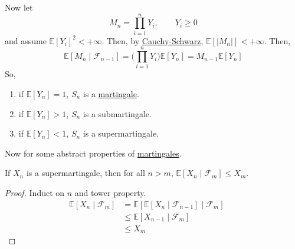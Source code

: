 	\begin{example}
	  \label{ex:products-of-nonnegative-random-variables}
	  Now let 
		\begin{equation}
			M_n = \prod_{i=1}^n Y_i, \qquad Y_i \geq 0
		\end{equation}
		and assume $\mathbb{E}[Y_i]^2 < +\infty$. Then, by \hyperref[thm:cauchy-schwarz]{Cauchy-Schwarz}, $\mathbb{E}[|M_n|] < +\infty$. Then, 
		\begin{equation}
			\mathbb{E}[M_n \mid \mathscr{F}_{n-1}] = \bigg( \prod_{i=1}^n Y_i \bigg) \mathbb{E}[Y_n] = M_{n-1} \mathbb{E}[Y_n]
		\end{equation}
		So, 
		\begin{enumerate}
			\item if $\mathbb{E}[Y_n] = 1$, $S_n$ is a \hyperref[def:martingale]{martingale}. 
			\item if $\mathbb{E}[Y_n] > 1$, $S_n$ is a submartingale. 
			\item if $\mathbb{E}[Y_n] < 1$, $S_n$ is a supermartingale. 
		\end{enumerate}
	\end{example}

	Now for some abstract properties of \hyperref[def:martingale]{martingales}. 

	\begin{lemma}
	  \label{thm:supermartingale-inequality-over-several-steps}
 
		If $X_n$ is a supermartingale, then for all $n > m$, $\mathbb{E}[X_n \mid \mathscr{F}_m] \leq X_m$.
	\end{lemma}
	\begin{proof}
	  Induct on $n$ and tower property. 
		\begin{align}
			\mathbb{E}[X_n \mid \mathscr{F}_m] & = \mathbb{E}[\mathbb{E}[X_n \mid \mathscr{F}_{n-1}] \mid \mathscr{F}_m ] && \tag{Tower Property} \\ 
																				 & \leq \mathbb{E}[X_{n-1} \mid \mathscr{F}_m ] && \tag{By Definition} \\ 
																				 & \leq X_m && \tag{Inductive Hypothesis}
		\end{align}
	\end{proof}

